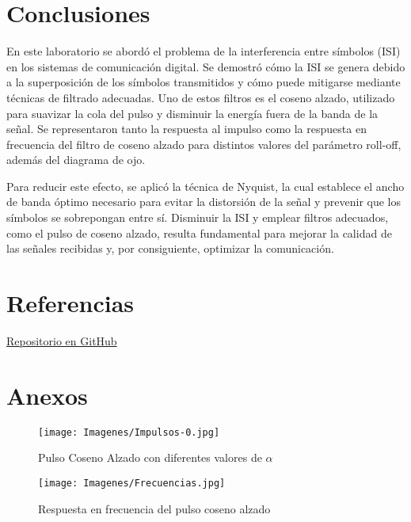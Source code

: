 \documentclass[lettersize,journal]{IEEEtran}
\begin{document}
\section{Conclusiones}\label{sec:conclusiones}
En este laboratorio se abordó el problema de la interferencia entre símbolos (ISI) en los sistemas de comunicación digital. Se demostró cómo la ISI se genera debido a la superposición de los símbolos transmitidos y cómo puede mitigarse mediante técnicas de filtrado adecuadas. Uno de estos filtros es el coseno alzado, utilizado para suavizar la cola del pulso y disminuir la energía fuera de la banda de la señal. Se representaron tanto la respuesta al impulso como la respuesta en frecuencia del filtro de coseno alzado para distintos valores del parámetro roll-off, además del diagrama de ojo.

Para reducir este efecto, se aplicó la técnica de Nyquist, la cual establece el ancho de banda óptimo necesario para evitar la distorsión de la señal y prevenir que los símbolos se sobrepongan entre sí. Disminuir la ISI y emplear filtros adecuados, como el pulso de coseno alzado, resulta fundamental para mejorar la calidad de las señales recibidas y, por consiguiente, optimizar la comunicación.
\section{Referencias}\label{sec:referencias}

\href{https://github.com/BrunoTrone1/lab_com_dig_2}{Repositorio en GitHub}
\section{Anexos}\label{sec:anexos}
\begin{figure}[H]
    \centering
    \texttt{[image: Imagenes/Impulsos-0.jpg]}
    \caption{Pulso Coseno Alzado con diferentes valores de $\alpha$}
    \label{fig:anexo1}
\end{figure}

\begin{figure}[H]
    \centering
    \texttt{[image: Imagenes/Frecuencias.jpg]}
    \caption{Respuesta en frecuencia del pulso coseno alzado}
    \label{fig:anexo2}
\end{figure}
\end{document}

